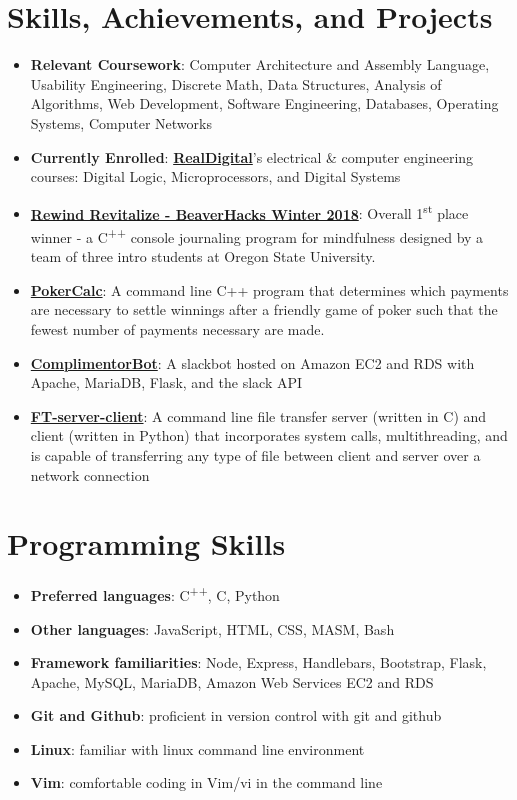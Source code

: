\documentclass[letterpaper,11pt]{article}
\newcommand{\resumeItem}[2]{
  \item\small{
    \textbf{#1}{: #2 \vspace{-2pt}}
  }
}
\newcommand{\resumeSubItem}[2]{\resumeItem{#1}{#2}\vspace{-4pt}}
\newcommand{\resumeSubHeadingListStart}{\begin{itemize}[leftmargin=*]}
\newcommand{\resumeSubHeadingListEnd}{\end{itemize}}
\begin{document}
\section{Skills, Achievements, and Projects}
  \resumeSubHeadingListStart
    \resumeSubItem{Relevant Coursework}
      {Computer Architecture and Assembly Language, Usability Engineering, Discrete Math, Data Structures, Analysis of Algorithms, Web Development, Software Engineering, Databases, Operating Systems, Computer Networks}
    \resumeSubItem{Currently Enrolled}
    	{\textbf{\href{https://www.realdigital.org}{RealDigital}}'s electrical \& computer engineering courses: Digital Logic, Microprocessors, and Digital Systems}
    \resumeSubItem{\href{https://github.com/jkbartos/rewind-revitalize}{Rewind Revitalize - BeaverHacks Winter 2018}}{Overall 1\textsuperscript{st} place winner - a C\textsuperscript{++} console journaling program for mindfulness designed by a team of three intro students at Oregon State University.}
    \resumeSubItem{\href{https://github.com/jordankbartos/PokerCalc}{PokerCalc}}
      {A command line C++ program that determines which payments are necessary to settle winnings after a friendly game of poker such that the fewest number of payments necessary are made.}
    \resumeSubItem{\href{https://github.com/jordankbartos/complimentor-bot-v2}{ComplimentorBot}}{A slackbot hosted on Amazon EC2 and RDS with Apache, MariaDB, Flask, and the slack API}
    \resumeSubItem{\href{}{FT-server-client}}{A command line file transfer server (written in C) and client (written in Python) that incorporates system calls, multithreading, and is capable of transferring any type of file between client and server over a network connection}

    
  \resumeSubHeadingListEnd
\hfill

\section{Programming Skills}
  \resumeSubHeadingListStart
    \resumeSubItem{Preferred languages}{ C\textsuperscript{++}, C, Python}
    \resumeSubItem{Other languages}{JavaScript, HTML, CSS, MASM, Bash}
    \resumeSubItem{Framework familiarities}{Node, Express, Handlebars, Bootstrap, Flask, Apache, MySQL, MariaDB, Amazon Web Services EC2 and RDS}
    \resumeSubItem{Git and Github}{proficient in version control with git and github}
    \resumeSubItem{Linux}{familiar with linux command line environment}
    \resumeSubItem{Vim}{comfortable coding in Vim/vi in the command line}
  \resumeSubHeadingListEnd
 \hfill

\end{document}
